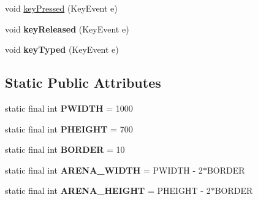 \begin{DoxyCompactItemize}
\item 
void \hyperlink{classbrick_breaker_1_1_game_panel_abf3d766d8fff87e69bfaf8ff59c438f3}{keyPressed} (KeyEvent e)
\item 
\hypertarget{classbrick_breaker_1_1_game_panel_a8c41cc926e88dc8d1a1c241e6b9ef12e}{
void {\bfseries keyReleased} (KeyEvent e)}
\label{classbrick_breaker_1_1_game_panel_a8c41cc926e88dc8d1a1c241e6b9ef12e}

\item 
\hypertarget{classbrick_breaker_1_1_game_panel_a23a455353c5904274a39f0f224cb0005}{
void {\bfseries keyTyped} (KeyEvent e)}
\label{classbrick_breaker_1_1_game_panel_a23a455353c5904274a39f0f224cb0005}

\end{DoxyCompactItemize}
\subsection*{Static Public Attributes}
\begin{DoxyCompactItemize}
\item 
\hypertarget{classbrick_breaker_1_1_game_panel_ade79ff9ff8f4de5cfa2f02fe8701e12d}{
static final int {\bfseries PWIDTH} = 1000}
\label{classbrick_breaker_1_1_game_panel_ade79ff9ff8f4de5cfa2f02fe8701e12d}

\item 
\hypertarget{classbrick_breaker_1_1_game_panel_a91b8f40423595d7b8736d6c0e8e3ce2e}{
static final int {\bfseries PHEIGHT} = 700}
\label{classbrick_breaker_1_1_game_panel_a91b8f40423595d7b8736d6c0e8e3ce2e}

\item 
\hypertarget{classbrick_breaker_1_1_game_panel_ac4460432a58e6284b97eaa6a08e69858}{
static final int {\bfseries BORDER} = 10}
\label{classbrick_breaker_1_1_game_panel_ac4460432a58e6284b97eaa6a08e69858}

\item 
\hypertarget{classbrick_breaker_1_1_game_panel_a59de5a835b862d59d91cf561eae7e87f}{
static final int {\bfseries ARENA\_\-WIDTH} = PWIDTH -\/ 2$\ast$BORDER}
\label{classbrick_breaker_1_1_game_panel_a59de5a835b862d59d91cf561eae7e87f}

\item 
\hypertarget{classbrick_breaker_1_1_game_panel_af1a2ab5d5cf158f0231a00ba886a8a10}{
static final int {\bfseries ARENA\_\-HEIGHT} = PHEIGHT -\/ 2$\ast$BORDER}
\label{classbrick_breaker_1_1_game_panel_af1a2ab5d5cf158f0231a00ba886a8a10}

\end{DoxyCompactItemize}


